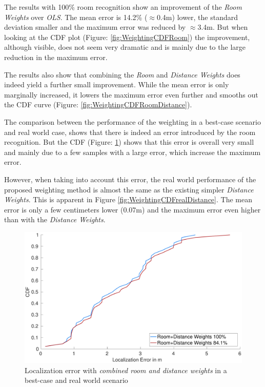The results with 100\% room recognition show an improvement of the \emph{Room Weights} over \emph{OLS}. The mean error is 14.2\% ($\approx$0.4m) lower, the standard deviation smaller and the maximum error was reduced by $\approx$3.4m. But when looking at the CDF plot (Figure: \ref{fig:WeightingCDFRoom}) the improvement, although visible, does not seem very dramatic and is mainly due to the large reduction in the maximum error.

The results also show that combining the \emph{Room} and \emph{Distance Weights} does indeed yield a further small improvement. While the mean error is only marginally increased, it lowers the maximum error even further and smooths out the CDF curve (Figure: \ref{fig:WeightingCDFRoomDistance}).

The comparison between the performance of the weighting in a best-case scenario and real world case, shows that there is indeed an error introduced by the room recognition. But the CDF (Figure: \ref{fig:WeightingCDFrealRoom}) shows that this error is overall very small and mainly due to a few samples with a large error, which increase the maximum error.

However, when taking into account this error, the real world performance of the proposed weighting method is almost the same as the existing simpler \emph{Distance Weights}. This is apparent in Figure \ref{fig:WeightingCDFrealDistance}. The mean error is only a few centimeters lower (0.07m) and the maximum error even higher than with the \emph{Distance Weights}.

\begin{figure}[bh]
\centering
\includegraphics[width=\textwidth]{Figures/WeightingCDF_realRW}
\decoRule
\caption[CDF Room+Distance Weights - best-case/real world comparison]{Localization error with \emph{combined room and distance weights} in a best-case and real world scenario}
\label{fig:WeightingCDFrealRoom}
\end{figure}

